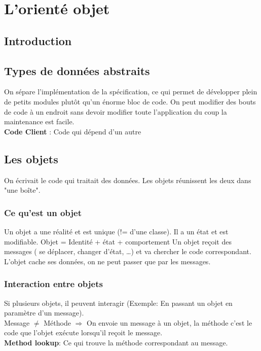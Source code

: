 \section{L’orienté objet}



\subsection{Introduction}



\subsection{Types de données abstraits}
On sépare l’implémentation de la spécification, ce qui permet de développer plein de petits modules plutôt qu’un énorme bloc de code. On peut modifier des bouts de code à un endroit sans devoir modifier toute l’application du coup la maintenance est facile.
\\\textbf{Code Client} : Code qui dépend d’un autre



\subsection{Les objets}
On écrivait le code qui traitait des données. Les objets réunissent les deux dans "une boîte".



\subsubsection{Ce qu’est un objet}
Un objet a une réalité et est unique (!= d’une classe). Il a un état et est modifiable.
Objet = Identité + état + comportement
Un objet reçoit des messages ( se déplacer, changer d’état, …) et va chercher le code correspondant. L’objet cache ses données, on ne peut passer que par les messages.



\subsubsection{Interaction entre objets}
Si plusieurs objets, il peuvent interagir (Exemple: En passant un objet en paramètre d’un message).
\\Message $\neq$ Méthode $\Rightarrow$ On envoie un message à un objet, la méthode c’est le code que l’objet exécute lorsqu’il reçoit le message.
\\\textbf{Method lookup}: Ce qui trouve la méthode correspondant au message.



